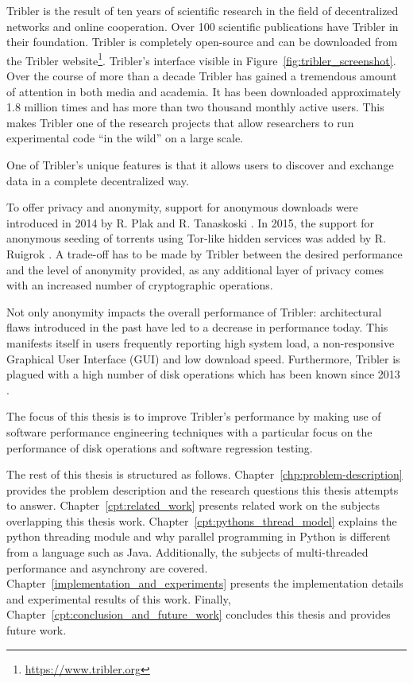 Tribler is the result of ten years of scientific research in the field of decentralized networks and online cooperation.
Over 100 scientific publications have Tribler in their foundation.
Tribler is completely open-source and can be downloaded from the Tribler website\footnote{\url{https://www.tribler.org}}.
Tribler's interface visible in Figure~\ref{fig:tribler_screenshot}.\\
Over the course of more than a decade Tribler has gained a tremendous amount of attention in both media and academia.
It has been downloaded approximately 1.8 million times and has more than two thousand  monthly active users.
This makes Tribler one of the research projects that allow researchers to run experimental code \enquote{in the wild} on a large scale.

One of Tribler's unique features is that it allows users to discover and exchange data in a complete decentralized way.

To offer privacy and anonymity, support for anonymous downloads were introduced in 2014 by R. Plak \cite{plak2014anonymous} and R. Tanaskoski \cite{tanaskoski2014anonymous}.
In 2015, the support for anonymous seeding of torrents using Tor-like hidden services was added by R. Ruigrok \cite{ruigrok2015bittorrent}.
A trade-off has to be made by Tribler between the desired performance and the level of anonymity provided, as any additional layer of privacy comes with an increased number of cryptographic operations.

Not only anonymity impacts the overall performance of Tribler: architectural flaws introduced in the past have led to a decrease in performance today.
This manifests itself in users frequently reporting high system load, a non-responsive Graphical User Interface (GUI) and low download speed.
Furthermore, Tribler is plagued with a high number of disk operations which has been known since 2013 \cite{pouwelse2014reduce}. 

The focus of this thesis is to improve Tribler's performance by making use of software performance engineering techniques with a particular focus on the performance of disk operations and software regression testing.

The rest of this thesis is structured as follows.
Chapter~\ref{chp:problem-description} provides the problem description and the research questions this thesis attempts to answer.
Chapter~\ref{cpt:related_work} presents related work on the subjects overlapping this thesis work.
Chapter~\ref{cpt:pythons_thread_model} explains the python threading module and why parallel programming in Python is different from a language such as Java. Additionally, the subjects of multi-threaded performance and asynchrony are covered.
Chapter~\ref{implementation_and_experiments} presents the implementation details and experimental results of this work.
Finally, Chapter~\ref{cpt:conclusion_and_future_work} concludes this thesis and provides future work.
